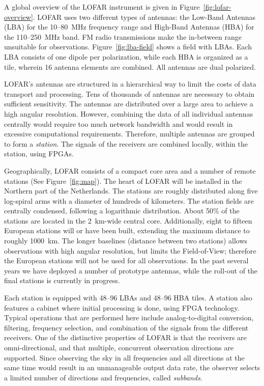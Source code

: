 \documentclass{sig-alternate}
\begin{document}
A global overview of the LOFAR instrument is given in
Figure~\ref{fig:lofar-overview}. LOFAR uses two different types of
antennas: the Low-Band Antennas (LBA) for the 10--80~MHz frequency
range and High-Band Antennas (HBA) for the 110--250~MHz band.
FM radio transmissions make the in-between range unsuitable for observations.
Figure~\ref{fig:lba-field} shows a field with LBAs. Each
LBA consists of one dipole per polarization, while each HBA is
organized as a tile, wherein 16 antenna elements are combined. All
antennas are dual polarized.

LOFAR's antennas are structured in a hierarchical way to limit the
costs of data transport and processing. Tens of thousands of antennas are
necessary to obtain sufficient sensitivity. The antennas are
distributed over a large area to achieve a high angular resolution.
However, combining the data of all individual antennas centrally would
require too much network bandwidth and would result in excessive
computational requirements. Therefore, multiple antennas are grouped
to form a \emph{station}.
The signals of the receivers are combined locally, within the station, using FPGAs.

Geographically, LOFAR consists of a compact core area and a number of
remote stations (See Figure~\ref{fig:map}).  The heart of LOFAR will
be installed in the Northern part of the Netherlands.  The stations
are roughly distributed along five log-spiral arms with a diameter of
hundreds of kilometers. 
The station fields are centrally condensed,
following a logarithmic distribution.  About 50\% of the stations are
located in the 2~km-wide central core.
Additionally, eight to fifteen European stations will or have been built,
extending the maximum distance to roughly 1000~km.
The longer baselines (distance between two stations) allows observations with high angular resolution,
but limits the Field-of-View; therefore the European stations will not be
used for all observations.
In the past several years we have deployed a number of prototype antennas,
while the roll-out of the final stations is currently in progress.

Each station is equipped with 48--96 LBAs and 48--96 HBA tiles. 
A station also features a cabinet where initial processing is done, using
FPGA technology.
Typical operations that are performed here include analog-to-digital
conversion, filtering, frequency selection, and combination of the signals
from the different receivers.
One of the distinctive properties of LOFAR is that the receivers are
omni-directional, and that multiple, concurrent observation directions are
supported.
Since observing the sky in all frequencies and all directions at the same time
would result in an unmanageable output data rate, the observer selects a
limited number of directions and frequencies, called \emph{subbands}.
\end{document}
